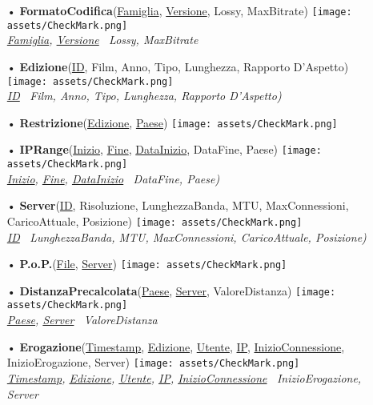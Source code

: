 \documentclass{article}
\begin{document}
\begin{itemize}
    \item[•] \textbf{FormatoCodifica}(\underline{Famiglia}, \underline{Versione}, Lossy, MaxBitrate) \texttt{[image: assets/CheckMark.png]} \\
    {\small \textit{\underline{Famiglia}, \underline{Versione} \textrightarrow\, Lossy, MaxBitrate}}

    \item[•] \textbf{Edizione}(\underline{ID}, Film, Anno, Tipo, Lunghezza, Rapporto D'Aspetto) \texttt{[image: assets/CheckMark.png]} \\
    {\small \textit{\underline{ID} \textrightarrow\, Film, Anno, Tipo, Lunghezza, Rapporto D'Aspetto)}}
    
    \item[•] \textbf{Restrizione}(\underline{Edizione}, \underline{Paese}) \texttt{[image: assets/CheckMark.png]} 
    
    \item[•] \textbf{IPRange}(\underline{Inizio}, \underline{Fine}, \underline{DataInizio}, DataFine, Paese) \texttt{[image: assets/CheckMark.png]} \\
    {\small \textit{\underline{Inizio}, \underline{Fine}, \underline{DataInizio} \textrightarrow\, DataFine, Paese)}}
    
    \item[•] \textbf{Server}(\underline{ID}, Risoluzione, LunghezzaBanda, MTU, MaxConnessioni, CaricoAttuale, Posizione) \texttt{[image: assets/CheckMark.png]} \\
    {\small \textit{\underline{ID} \textrightarrow\, LunghezzaBanda, MTU, MaxConnessioni, CaricoAttuale, Posizione)}}
    
    \item[•] \textbf{P.o.P.}(\underline{File}, \underline{Server}) \texttt{[image: assets/CheckMark.png]}
    
    \item[•] \textbf{DistanzaPrecalcolata}(\underline{Paese}, \underline{Server}, ValoreDistanza) \texttt{[image: assets/CheckMark.png]} \\
    {\small \textit{\underline{Paese}, \underline{Server} \textrightarrow\, ValoreDistanza}}

    \item[•] \textbf{Erogazione}(\underline{Timestamp}, \underline{Edizione}, \underline{Utente}, \underline{IP}, \underline{InizioConnessione}, InizioErogazione, Server) \texttt{[image: assets/CheckMark.png]} \\
    {\small \textit{\underline{Timestamp}, \underline{Edizione}, \underline{Utente}, \underline{IP}, \underline{InizioConnessione} \textrightarrow\, InizioErogazione, Server}}


\end{itemize}
\end{document}
